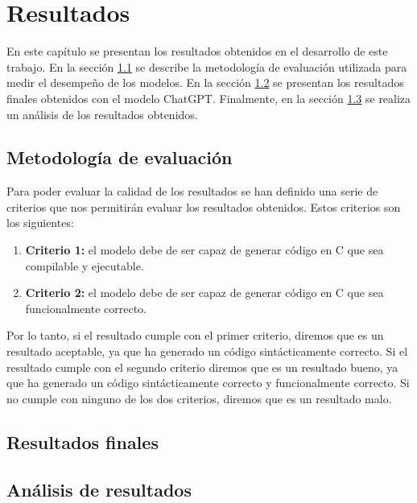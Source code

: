 \chapter{Resultados}
\label{cap:resultados}


En este capítulo se presentan los resultados obtenidos en el desarrollo de este trabajo. 
En la sección \ref{sec:evaluacion} se describe la metodología de evaluación utilizada 
para medir el desempeño de los modelos. En la sección \ref{sec:resultados_finales} se
presentan los resultados finales obtenidos con el modelo ChatGPT. Finalmente, en la
sección \ref{sec:analisis_resultados} se realiza un análisis de los resultados obtenidos.

\section{Metodología de evaluación}
\label{sec:evaluacion}


Para poder evaluar la calidad de los resultados se han definido una serie de criterios que
nos permitirán evaluar los resultados obtenidos. Estos criterios son los siguientes:

\begin{enumerate}
    \item \textbf{Criterio 1:} el modelo debe de ser capaz de generar código en C que sea
        compilable y ejecutable.
    \item \textbf{Criterio 2:} el modelo debe de ser capaz de generar código en C que sea
        funcionalmente correcto.
\end{enumerate}

Por lo tanto, si el resultado cumple con el primer criterio, diremos que es un resultado aceptable,
ya que ha generado un código sintácticamente correcto. Si el resultado cumple con el segundo criterio
diremos que es un resultado bueno, ya que ha generado un código sintácticamente correcto y funcionalmente
correcto. Si no cumple con ninguno de los dos criterios, diremos que es un resultado malo.

\section{Resultados finales}
\label{sec:resultados_finales}

\section{Análisis de resultados}
\label{sec:analisis_resultados}